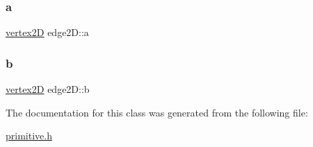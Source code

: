 \subsubsection{\texorpdfstring{a}{a}}
{\footnotesize\ttfamily \mbox{\hyperlink{classvertex2_d}{vertex2D}} edge2\+D\+::a}

\mbox{\label{classedge2_d_a34a5d6f487b0935992736b14ef7abe21}} 
\subsubsection{\texorpdfstring{b}{b}}
{\footnotesize\ttfamily \mbox{\hyperlink{classvertex2_d}{vertex2D}} edge2\+D\+::b}



The documentation for this class was generated from the following file\+:\begin{DoxyCompactItemize}
\item 
\mbox{\hyperlink{primitive_8h}{primitive.\+h}}\end{DoxyCompactItemize}
